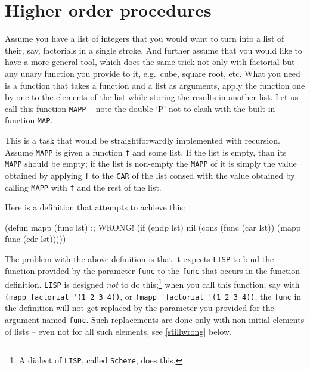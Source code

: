 \documentclass[a4paper,11pt]{article}
\begin{document}
\section{Higher order procedures}

\begin{uenum}
\item Assume you have a list of integers that you would want to turn into a list of their, say, factorials in a single stroke. And further assume that you would like to have a more general tool, which does the same trick not only with factorial but any unary function you provide to it, e.g.\ cube, square root, etc. What you need is a function that takes a function and a list as arguments, apply the function one by one to the elements of the list while storing the results in another list. Let us call this function \Verb+MAPP+ -- note the double `P' not to clash with the built-in function \Verb+MAP+.

\begin{uenumi}
\item This is a task that would be straightforwardly implemented with recursion. Assume \Verb+MAPP+ is given a function \Verb+f+ and some list. If the list is empty, than its \Verb+MAPP+ should be empty; if the list is non-empty the \Verb+MAPP+ of it is simply the value obtained by applying \Verb+f+ to the \Verb+CAR+ of the list consed with the value obtained by calling \Verb+MAPP+ with \Verb+f+ and the rest of the list.
\item Here is a definition that attempts to achieve this:

\begin{lispcode}
(defun mapp (func lst) ;; WRONG!
  (if (endp lst)
	nil
	(cons (func (car lst)) (mapp func (cdr lst)))))
\end{lispcode}

\item The problem with the above definition is that it expects \Verb+LISP+ to bind the function provided by the parameter \Verb+func+ to the \Verb+func+ that occurs in the function definition. \Verb+LISP+ is designed \emph{not} to do this;\footnote{A dialect of \Verb+LISP+, called \Verb+Scheme+, does this.} when you call this function, say with \Verb+(mapp factorial '(1 2 3 4))+, or \Verb+(mapp 'factorial '(1 2 3 4))+, the \Verb+func+ in the definition will not get replaced by the parameter you provided for the argument named \Verb+func+. Such replacements are done only with non-initial elements of lists -- even not for all such elements, see \ref{stillwrong} below. 


\end{uenumi}
\end{uenum}
\end{document}
